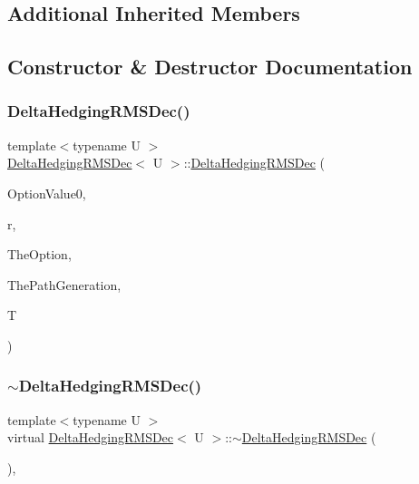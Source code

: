 \subsection*{Additional Inherited Members}


\subsection{Constructor \& Destructor Documentation}
\hypertarget{classDeltaHedgingRMSDec_a47c0fd66e96b5c75dfc999883e4124d3}{}\label{classDeltaHedgingRMSDec_a47c0fd66e96b5c75dfc999883e4124d3} 
\subsubsection{\texorpdfstring{Delta\+Hedging\+R\+M\+S\+Dec()}{DeltaHedgingRMSDec()}}
{\footnotesize\ttfamily template$<$typename U $>$ \\
\hyperlink{classDeltaHedgingRMSDec}{Delta\+Hedging\+R\+M\+S\+Dec}$<$ U $>$\+::\hyperlink{classDeltaHedgingRMSDec}{Delta\+Hedging\+R\+M\+S\+Dec} (\begin{DoxyParamCaption}\item[{double}]{Option\+Value0,  }\item[{double}]{r,  }\item[{shared\+\_\+ptr$<$ U $>$}]{The\+Option,  }\item[{shared\+\_\+ptr$<$ \hyperlink{classPathGenerationHeston}{Path\+Generation\+Heston} $>$}]{The\+Path\+Generation,  }\item[{double}]{T }\end{DoxyParamCaption})}

\hypertarget{classDeltaHedgingRMSDec_ac01f0ab7f61f34e2d02b2be0a4f109c0}{}\label{classDeltaHedgingRMSDec_ac01f0ab7f61f34e2d02b2be0a4f109c0} 
\subsubsection{\texorpdfstring{$\sim$\+Delta\+Hedging\+R\+M\+S\+Dec()}{~DeltaHedgingRMSDec()}}
{\footnotesize\ttfamily template$<$typename U $>$ \\
virtual \hyperlink{classDeltaHedgingRMSDec}{Delta\+Hedging\+R\+M\+S\+Dec}$<$ U $>$\+::$\sim$\hyperlink{classDeltaHedgingRMSDec}{Delta\+Hedging\+R\+M\+S\+Dec} (\begin{DoxyParamCaption}{ }\end{DoxyParamCaption})\hspace{0.3cm}{\ttfamily [inline]}, {\ttfamily [virtual]}}



